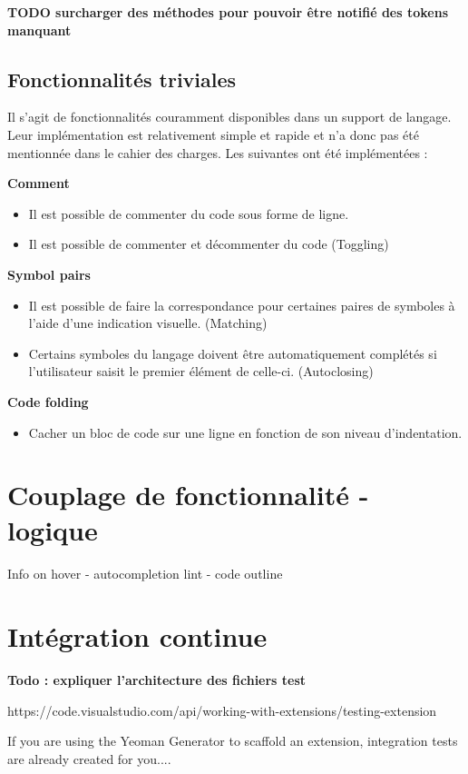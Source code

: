 \documentclass[
    iict, %
    il, %
]{heig-tb}
\begin{document}
\textbf{TODO surcharger des méthodes pour pouvoir être notifié des tokens manquant}

\section{Fonctionnalités triviales}
Il s'agit de fonctionnalités couramment disponibles dans un support de langage. Leur implémentation est relativement simple et rapide et n'a donc pas été mentionnée dans le cahier des charges.
Les suivantes ont été implémentées :

\textbf{Comment}
\begin{itemize}
    \item Il est possible de commenter du code sous forme de ligne.
    \item Il est possible de commenter et décommenter du code (Toggling)
\end{itemize}

\textbf{Symbol pairs}
\begin{itemize}
    \item Il est possible de faire la correspondance pour certaines paires de symboles à l'aide d'une indication visuelle. (Matching)
    \item Certains symboles du langage doivent être automatiquement complétés si l'utilisateur saisit le premier élément de celle-ci. (Autoclosing)
\end{itemize}

\textbf{Code folding}
\begin{itemize}
    \item Cacher un bloc de code sur une ligne en fonction de son niveau d'indentation.
\end{itemize}

\chapter{Couplage de fonctionnalité - logique}
Info on hover - autocompletion
lint - code outline

\chapter{Intégration continue}

\textbf{Todo : expliquer l'architecture des fichiers test}

https://code.visualstudio.com/api/working-with-extensions/testing-extension

If you are using the Yeoman Generator to scaffold an extension, integration tests are already created for you....
\end{document}
